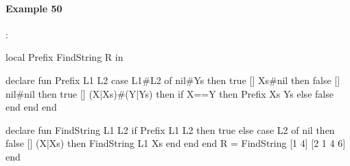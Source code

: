 \documentclass[11pt,a4paper,twoside,openright]{report}
\begin{document}
%
%
%
%	
%
%
%
%
%
%
%


\paragraph{Example 50}:

\begin{OZ}

local Prefix FindString R in
	
declare
fun {Prefix L1 L2}
   case L1#L2
   of nil#Ys then true
   [] Xs#nil then false
   [] nil#nil then true
   [] (X|Xs)#(Y|Ys) then
      if X==Y then {Prefix Xs Ys}
      else false end
   end
end


declare
fun {FindString L1 L2}
   if {Prefix L1 L2} then true
   else
      case L2
      of nil then false
      [] (X|Xs) then {FindString L1 Xs}
      end
   end
end
R = {FindString [1 4] [2 1 4 6]}
end

\end{OZ}
\end{document}

